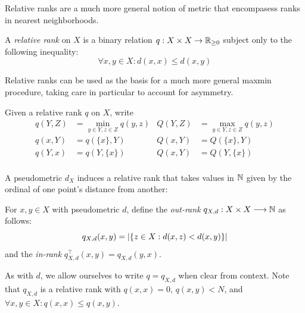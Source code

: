 \documentclass{article}
\begin{document}
Relative ranks are a much more general notion of metric that encompasess
ranks in nearest neighborhoods.

\begin{definition}
    A \emph{relative rank} on $X$ is a binary relation $q: X \times X \to \mathbb{R}_{\geq 0}$ subject only to the following inequality:
    \begin{equation}\label{eqn:relative-rank}
        \forall x,y \in X : d(x,x) \leq d(x,y)
    \end{equation}
\end{definition}

Relative ranks can be used as the basis for a much more general maxmin
procedure, taking care in particular to account for asymmetry.

Given a relative rank \(q\) on \(X\), write \begin{align*}
    q(Y,Z) &= \min_{y\in Y,z\in Z}{q(y,z)} & Q(Y,Z) &= \max_{y\in Y,z\in Z}{q(y,z)} \\
    q(x,Y) &= q(\{x\},Y)                   & Q(x,Y) &= Q(\{x\},Y) \\
    q(Y,x) &= q(Y,\{x\})                   & Q(x,Y) &= Q(Y,\{x\}) \\
\end{align*}

A pseudometric \(d_X\) induces a relative rank that takes values in
\(\mathbb{N}\) given by the ordinal of one point's distance from another:

\begin{definition}
    For $x,y\in X$ with pseudometric $d$, define the \emph{out-rank} $q_{X,d} : X \times X \longrightarrow \mathbb{N}$ as follows:
    \begin{equation}\label{eqn:out-rank}
        q_{X,d}(x,y)=\abs{\{z\in X \where d(x,z) < d(x,y)\}}%
    \end{equation}
    and the \emph{in-rank} $q_{X,d}^\top(x,y) = q_{X,d}(y,x)$.
\end{definition}

As with \(d\), we allow ourselves to write \(q=q_{X,d}\) when clear from
context. Note that \(q_{X,d}\) is a relative rank with \(q(x,x)=0\),
\(q(x,y) < N\), and \(\forall x,y \in X : q(x,x) \leq q(x,y)\).
\end{document}
